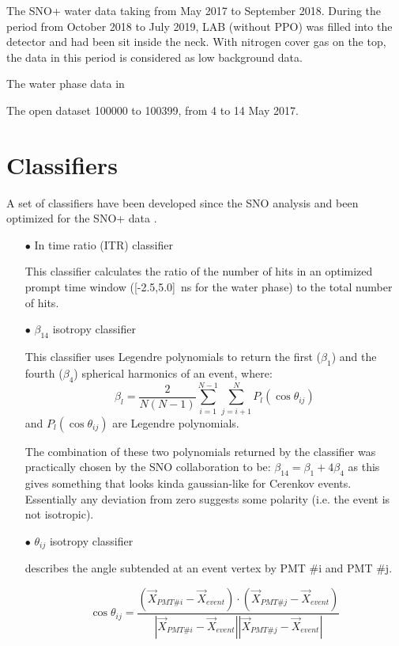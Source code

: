 The SNO+ water data taking from May 2017 to September 2018. During the period from October 2018 to July 2019, LAB (without PPO) was filled into the detector and had been sit inside the neck. With nitrogen cover gas on the top, the data in this period is considered as low background data.




The water phase data in 


The open dataset 100000 to 100399, from 4 to 14 May 2017.
















\section{Classifiers}

A set of classifiers have been developed since the SNO analysis and been optimized for the SNO+ data \cite{highlevel}.


\begin{itemize}

\item[$\bullet$] In time ratio (ITR) classifier

This classifier calculates the ratio of the number of hits in an optimized prompt time window ([-2.5,5.0]~ns for the water phase) to the total number of hits.


\item[$\bullet$] $\beta_{14}$ isotropy classifier

This classifier uses Legendre polynomials to return the	first ($\beta_1$) and the fourth ($\beta_4$) spherical	harmonics of an event, where:
\[
\beta_l = \frac{2}{N(N-1)}\sum_{i=1}^{N-1}\sum_{j=i+1}^N P_l(\cos\theta_{ij})
\]
and $P_l(\cos\theta_{ij})$ are Legendre polynomials.

The	combination	of these two polynomials returned by the classifier	was	
practically	chosen by the SNO collaboration	to be: $\beta_{14}=\beta_1+4\beta_4$
as	this gives	something	that	looks	kinda gaussian-like	for	Cerenkov	events.	
Essentially	any	deviation	from	zero	suggests	some	polarity	(i.e.	the	event	is	not	
isotropic).	



\item[$\bullet$] $\theta_{ij}$ isotropy classifier 

describes the angle subtended at an event vertex by PMT \#i and PMT \#j.

\[
\cos\theta_{ij}=\frac{(\vec{X}_{PMT\#i}- \vec{X}_{event})\cdot (\vec{X}_{PMT\#j}- \vec{X}_{event})}{|\vec{X}_{PMT\#i}- \vec{X}_{event}||\vec{X}_{PMT\#j}- \vec{X}_{event}|}
\]
\end{itemize}


